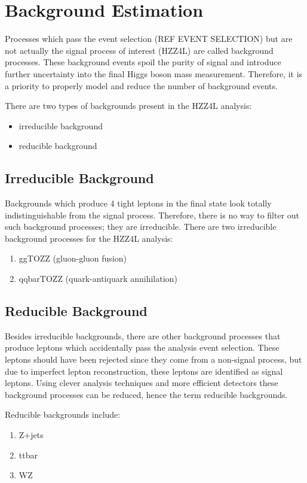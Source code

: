 \section{Background Estimation}
\label{sec:bkg_estim}

Processes which pass the event selection (REF EVENT SELECTION) but are not actually the signal process of interest (HZZ4L) are called background processes.
These background events spoil the purity of signal and introduce further uncertainty into the final Higgs boson mass measurement.
Therefore, it is a priority to properly model and reduce the number of background events.

There are two types of backgrounds present in the HZZ4L analysis:

\begin{itemize}
    \item irreducible background
    \item reducible background
\end{itemize}






\subsection{Irreducible Background}
\label{sec:bkg_irred}

Backgrounds which produce 4 tight leptons in the final state look totally indistinguishable from the signal process.
Therefore, there is no way to filter out such background processes; they are irreducible.
There are two irreducible background processes for the HZZ4L analysis:

\begin{enumerate}
    \item ggTOZZ (gluon-gluon fusion)
    \item qqbarTOZZ (quark-antiquark annihilation)
\end{enumerate}






\subsection{Reducible Background}
\label{sec:bkg_red}

Besides irreducible backgrounds, there are other background processes that produce leptons which accidentally pass the analysis event selection.
These leptons should have been rejected since they come from a non-signal process, but due to imperfect lepton reconstruction, these leptons are identified as signal leptons.
Using clever analysis techniques and more efficient detectors these background processes can be reduced, hence the term reducible backgrounds.

Reducible backgrounds include:

\begin{enumerate}
    \item Z+jets
    \item ttbar
    \item WZ
\end{enumerate}

